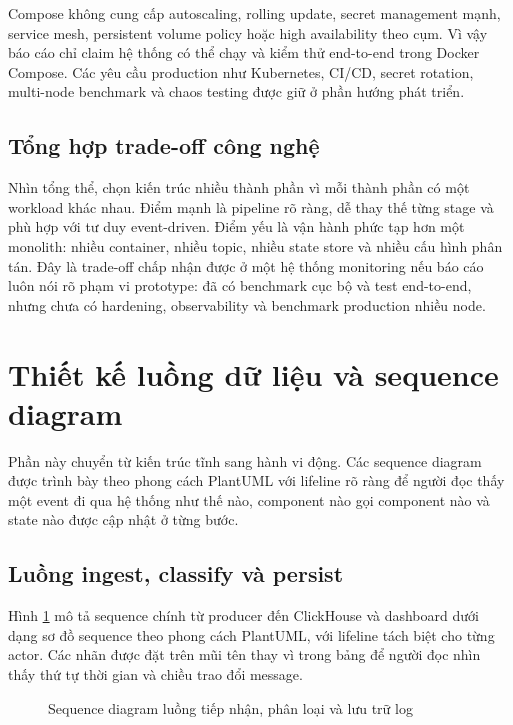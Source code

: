 Compose không cung cấp autoscaling, rolling update, secret management mạnh, service mesh, persistent volume policy hoặc high availability theo cụm. Vì vậy báo cáo chỉ claim hệ thống có thể chạy và kiểm thử end-to-end trong Docker Compose. Các yêu cầu production như Kubernetes, CI/CD, secret rotation, multi-node benchmark và chaos testing được giữ ở phần hướng phát triển.

\subsection{Tổng hợp trade-off công nghệ}

Nhìn tổng thể, \LogRider{} chọn kiến trúc nhiều thành phần vì mỗi thành phần có một workload khác nhau. Điểm mạnh là pipeline rõ ràng, dễ thay thế từng stage và phù hợp với tư duy event-driven. Điểm yếu là vận hành phức tạp hơn một monolith: nhiều container, nhiều topic, nhiều state store và nhiều cấu hình phân tán. Đây là trade-off chấp nhận được ở một hệ thống monitoring nếu báo cáo luôn nói rõ phạm vi prototype: đã có benchmark cục bộ và test end-to-end, nhưng chưa có hardening, observability và benchmark production nhiều node.

\section{Thiết kế luồng dữ liệu và sequence diagram}

Phần này chuyển từ kiến trúc tĩnh sang hành vi động. Các sequence diagram được trình bày theo phong cách PlantUML với lifeline rõ ràng để người đọc thấy một event đi qua hệ thống như thế nào, component nào gọi component nào và state nào được cập nhật ở từng bước.

\subsection{Luồng ingest, classify và persist}

Hình \ref{fig:seq-ingest} mô tả sequence chính từ producer đến ClickHouse và dashboard dưới dạng sơ đồ sequence theo phong cách PlantUML, với lifeline tách biệt cho từng actor. Các nhãn được đặt trên mũi tên thay vì trong bảng để người đọc nhìn thấy thứ tự thời gian và chiều trao đổi message.

\begin{figure}[H]
\centering
\makebox[\textwidth][c]{}
\caption{Sequence diagram luồng tiếp nhận, phân loại và lưu trữ log}
\label{fig:seq-ingest}
\end{figure}

